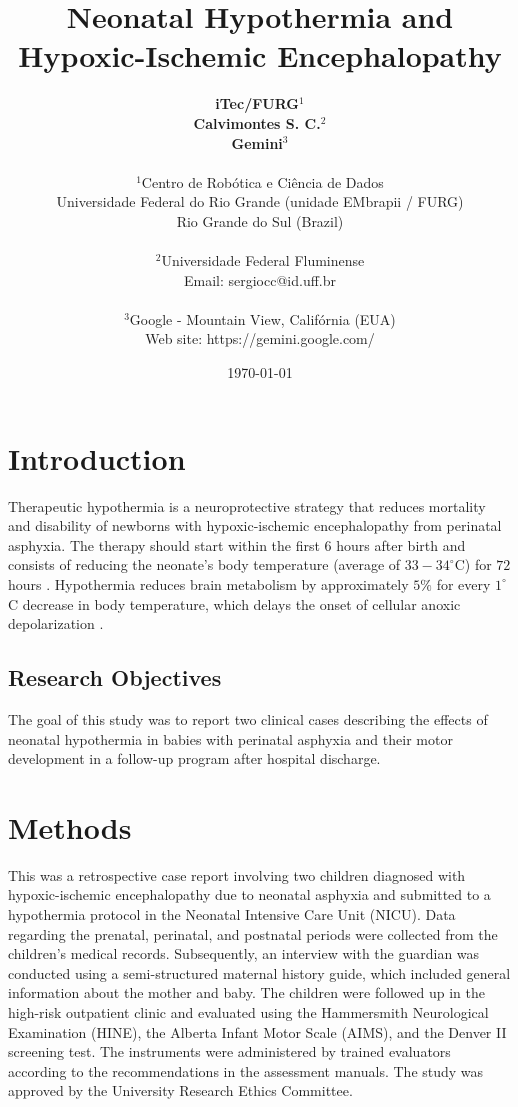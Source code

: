 \documentclass[11pt,a4paper]{article}
\title{\textbf{Neonatal Hypothermia and Hypoxic-Ischemic Encephalopathy}}
\author{
	\textbf{iTec/FURG}$^{1}$ \\
	\textbf{Calvimontes S. C.}$^{2}$ \\
	\textbf{Gemini}$^{3}$ \\
	\\
	\small $^{1}$Centro de Robótica e Ciência de Dados \\
	\small Universidade Federal do Rio Grande (unidade EMbrapii / FURG) \\
	\small Rio Grande do Sul (Brazil) \\
	\\
	\small $^{2}$Universidade Federal Fluminense \\
	\small Email: sergiocc@id.uff.br \\
	\\
	\small $^{3}$Google - Mountain View, Califórnia (EUA) \\
	\small Web site: https://gemini.google.com/
}
\date{\today}
\begin{document}
	
	\maketitle
	
	\newpage
	
	\section{Introduction}
	Therapeutic hypothermia is a neuroprotective strategy that reduces mortality and disability of newborns with hypoxic-ischemic encephalopathy from perinatal asphyxia. The therapy should start within the first 6 hours after birth and consists of reducing the neonate's body temperature (average of $33-34^{\circ}$C) for $72$ hours \cite{Azzopardi2014, Thayyil2021, Abate2021}. Hypothermia reduces brain metabolism by approximately $5\%$ for every $1^{\circ}$C decrease in body temperature, which delays the onset of cellular anoxic depolarization \cite{Silveira2015}.
		
	\subsection{Research Objectives}
	The goal of this study was to report two clinical cases describing the effects of neonatal hypothermia in babies with perinatal asphyxia and their motor development in a follow-up program after hospital discharge.
	
	\section{Methods}
	This was a retrospective case report involving two children diagnosed with hypoxic-ischemic encephalopathy due to neonatal asphyxia and submitted to a hypothermia protocol in the Neonatal Intensive Care Unit (NICU). Data regarding the prenatal, perinatal, and postnatal periods were collected from the children's medical records. Subsequently, an interview with the guardian was conducted using a semi-structured maternal history guide, which included general information about the mother and baby. The children were followed up in the high-risk outpatient clinic and evaluated using the Hammersmith Neurological Examination (HINE), the Alberta Infant Motor Scale (AIMS), and the Denver II screening test. The instruments were administered by trained evaluators according to the recommendations in the assessment manuals. The study was approved by the University Research Ethics Committee.
	
\end{document}
